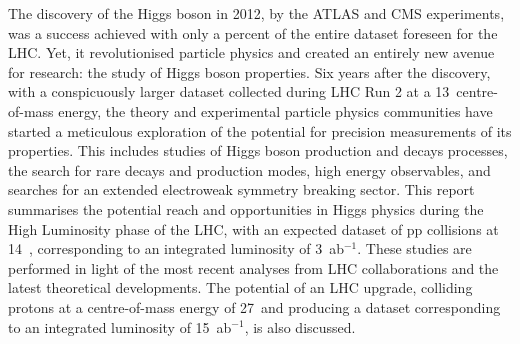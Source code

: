 \documentclass[11pt,twoside,a4paper]{cernrep}
\begin{document}
\begin{titlepage}
\newpage
\begin{center}\begin{abstract}\noindent\end{abstract}\end{center}
The discovery of the Higgs boson in 2012, by the
ATLAS and CMS experiments, was a success achieved with only
a percent of the entire dataset foreseen for the
LHC. 
Yet, it revolutionised particle physics and
created an entirely new avenue for research: the study of Higgs boson properties. 
Six years after the discovery, with a conspicuously larger dataset collected during LHC Run 2
 at a  13~\UTeV centre-of-mass energy, the theory and experimental particle physics communities have
started a meticulous exploration of the potential for precision measurements of its properties.
This includes studies of Higgs boson production and
decays processes, the search for rare decays and production modes, high energy observables, and searches for an extended electroweak symmetry breaking
sector. 
This report summarises the potential reach and opportunities in Higgs physics during the High 
Luminosity phase of the LHC, with an expected dataset of pp collisions at 14~\UTeV, 
corresponding to an integrated luminosity of 3~ab$^{-1}$. These studies are performed in light of the 
most recent analyses from LHC collaborations and the latest theoretical developments. 
The potential of an LHC upgrade, colliding
protons at a centre-of-mass energy of 27~\UTeV and producing a dataset 
corresponding to an integrated luminosity of 15~ab$^{-1}$, is also 
discussed. 






\end{titlepage}
\end{document}
